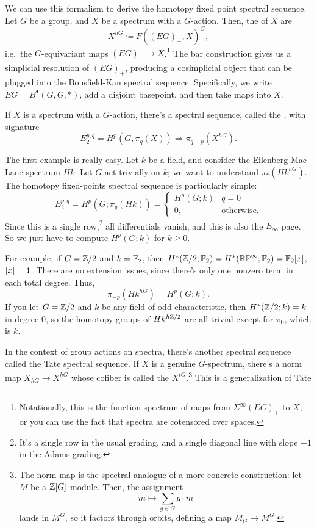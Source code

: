We can use this formalism to derive the homotopy fixed point spectral sequence. Let $G$ be a group, and $X$ be a
spectrum with a $G$-action. Then, the  of $X$ are
\[X^{hG}\coloneqq F((EG)_+, X)^G,\]
i.e.\ the $G$-equivariant maps $(EG)_+\to X$.\footnote{Notationally, this is the function spectrum of maps from
$\Sigma^\infty (EG)_+$ to $X$, or you can use the fact that spectra are cotensored over spaces.} The bar
construction gives us a simplicial resolution of $(EG)_+$, producing a cosimplicial object that can be plugged into
the Bousfield-Kan spectral sequence. Specifically, we write $EG = B^\bullet(G,G,*)$, add a disjoint basepoint, and
then take maps into $X$.
\begin{thm}
If $X$ is a spectrum with a $G$-action, there's a spectral sequence, called the , with signature
\[E_2^{p,q} = H^p(G, \pi_q(X))\Longrightarrow \pi_{q-p}(X^{hG}).\]
\end{thm}
\begin{exm}
The first example is really easy. Let $k$ be a field, and consider the Eilenberg-Mac Lane spectrum $Hk$. Let $G$
act trivially on $k$; we want to understand $\pi_*(Hk^{hG})$. The homotopy fixed-points spectral sequence is
particularly simple:
\[E_2^{p,q} = H^p(G; \pi_q(Hk)) = \begin{cases}
	H^p(G; k) &q = 0\\
	0, &\text{otherwise.}
\end{cases}\]
Since this is a single row,\footnote{It's a single row in the usual grading, and a single diagonal line with slope
$-1$ in the Adams grading.} all differentials vanish, and this is also the $E_\infty$ page. So we just have to
compute $H^p(G;k)$ for $k\ge 0$.

For example, if $G = \mathbb Z/2$ and $k = \mathbb F_2$, then $H^*(\mathbb Z/2; \mathbb F_2) = H^*(\mathbb{RP}^\infty;\mathbb F_2) = \mathbb F_2[x]$, $\lvert x\rvert = 1$.
There are no extension issues, since there's only one nonzero term in each total degree. Thus,
\[\pi_{-p}(Hk^{hG}) = H^p(G; k).\]
If you let $G = \mathbb Z/2$ and $k$ be any field of odd characteristic, then $H^*(\mathbb Z/2; k) = k$ in degree $0$, so the
homotopy groups of $Hk^{h\mathbb Z/2}$ are all trivial except for $\pi_0$, which is $k$.
\end{exm}
In the context of group actions on spectra, there's another spectral sequence called the Tate spectral sequence.
If $X$ is a genuine $G$-spectrum, there's a norm map $X_{hG}\to X^{hG}$ whose cofiber is called the  $X^{tG}$.\footnote{The norm map is the spectral analogue of a more concrete construction: let $M$ be a
$\mathbb Z[G]$-module. Then, the assignment
\[m\mapsto\sum_{g\in G} g\cdot m\]
lands in $M^G$, so it factors through orbits, defining a map $M_G\to M^G$.} This is a generalization of Tate
